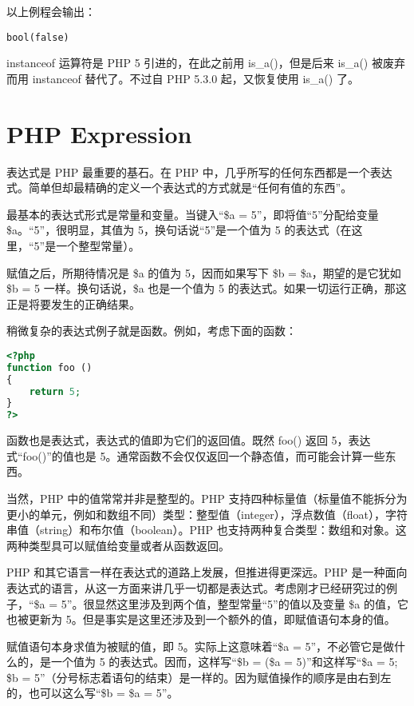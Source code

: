 以上例程会输出：

\begin{verbatim}
bool(false)
\end{verbatim}

instanceof 运算符是 PHP 5 引进的，在此之前用 is\_a()，但是后来 is\_a() 被废弃而用 instanceof 替代了。不过自 PHP 5.3.0 起，又恢复使用 is\_a() 了。




\chapter{PHP Expression}


表达式是 PHP 最重要的基石。在 PHP 中，几乎所写的任何东西都是一个表达式。简单但却最精确的定义一个表达式的方式就是“任何有值的东西”。

最基本的表达式形式是常量和变量。当键入“\$a = 5”，即将值“5”分配给变量 \$a。“5”，很明显，其值为 5，换句话说“5”是一个值为 5 的表达式（在这里，“5”是一个整型常量）。

赋值之后，所期待情况是 \$a 的值为 5，因而如果写下 \$b = \$a，期望的是它犹如 \$b = 5 一样。换句话说，\$a 也是一个值为 5 的表达式。如果一切运行正确，那这正是将要发生的正确结果。

稍微复杂的表达式例子就是函数。例如，考虑下面的函数：

\begin{lstlisting}[language=PHP]
<?php
function foo ()
{
    return 5;
}
?>
\end{lstlisting}

函数也是表达式，表达式的值即为它们的返回值。既然 foo() 返回 5，表达式“foo()”的值也是 5。通常函数不会仅仅返回一个静态值，而可能会计算一些东西。

当然，PHP 中的值常常并非是整型的。PHP 支持四种标量值（标量值不能拆分为更小的单元，例如和数组不同）类型：整型值（integer），浮点数值（float），字符串值（string）和布尔值（boolean）。PHP 也支持两种复合类型：数组和对象。这两种类型具可以赋值给变量或者从函数返回。

PHP 和其它语言一样在表达式的道路上发展，但推进得更深远。PHP 是一种面向表达式的语言，从这一方面来讲几乎一切都是表达式。考虑刚才已经研究过的例子，“\$a = 5”。很显然这里涉及到两个值，整型常量“5”的值以及变量 \$a 的值，它也被更新为 5。但是事实是这里还涉及到一个额外的值，即赋值语句本身的值。

赋值语句本身求值为被赋的值，即 5。实际上这意味着“\$a = 5”，不必管它是做什么的，是一个值为 5 的表达式。因而，这样写“\$b = (\$a = 5)”和这样写“\$a = 5; \$b = 5”（分号标志着语句的结束）是一样的。因为赋值操作的顺序是由右到左的，也可以这么写“\$b = \$a = 5”。

